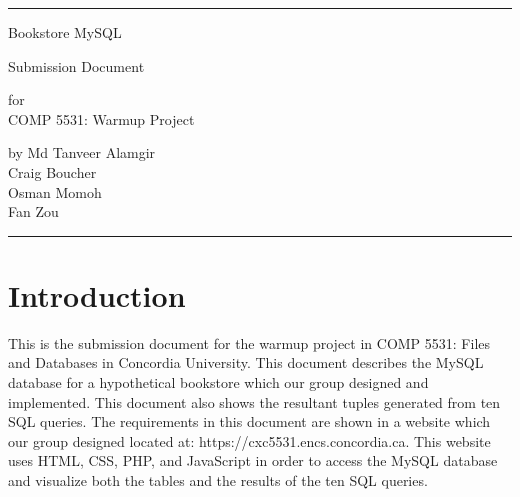 \documentclass{scrreprt}
\date{}
\begin{document}
\begin{titlepage}
  \flushright\bfseries\huge
    \rule{\linewidth}{5pt}
    \par
    \vspace{1cm}
    {\Huge Bookstore MySQL \par Submission Document\par}
    \vspace{2cm}
    for \\
    \vspace{2cm}
    COMP 5531: Warmup Project \\
    \vspace{2cm}

    by Md Tanveer Alamgir \\
     Craig Boucher\\
     Osman Momoh\\
     Fan Zou\\
    \vspace{2cm}
    \rule{\linewidth}{5pt}
\end{titlepage}
\tableofcontents
\chapter{Introduction}
This is the submission document for the warmup project in COMP 5531: Files and Databases in Concordia University. This document describes the MySQL database for a hypothetical bookstore which our group designed and implemented. This document also shows the resultant tuples generated from ten SQL queries. The requirements in this document are shown in a website which our group designed located at: https://cxc5531.encs.concordia.ca. This website uses HTML, CSS, PHP, and JavaScript in order to access the MySQL database and visualize both the tables and the results of the ten SQL queries.
\end{document}
